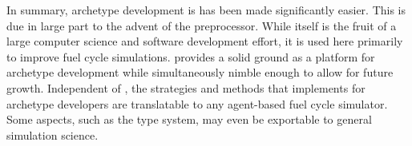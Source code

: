 In summary, archetype development is has been made significantly easier. This is due in large
part to the advent of the \cyclus preprocessor. While \cycpp itself is the fruit of
a large computer science and software development effort, it is used here 
primarily to improve fuel cycle simulations. \cyclus provides a solid ground 
as a platform for archetype development while simultaneously nimble enough
to allow for future growth. Independent of \cyclus, the strategies and methods that
\cyclus implements for archetype developers are translatable to any agent-based 
fuel cycle simulator.  Some aspects, such as the type system,  may even be exportable 
to general simulation science. 


